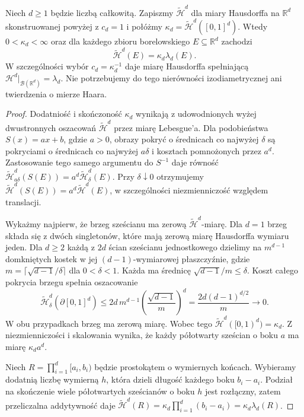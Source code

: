 \begin{twierdzenie}
\label{thm:hausdorff-calibration-26}
Niech $d\ge1$ będzie liczbą całkowitą. Zapiszmy
$\widetilde{\mathcal H}^{d}$ dla miary Hausdorffa
na $\mathbb R^d$ skonstruowanej powyżej z $c_d=1$
i połóżmy $\kappa_d=\widetilde{\mathcal H}^{d}([0,1]^d)$.
Wtedy $0<\kappa_d<\infty$ oraz dla każdego
zbioru borelowskiego $E\subseteq\mathbb R^d$
zachodzi
\[
 \widetilde{\mathcal H}^{d}(E)=\kappa_d\lambda_d(E).
\]
W szczególności wybór $c_d=\kappa_d^{-1}$ daje
miarę Hausdorffa spełniającą
$\mathcal H^d|_{\mathcal B(\mathbb R^d)}=\lambda_d$.
Nie potrzebujemy do tego nierówności izodiametrycznej
ani twierdzenia o mierze Haara.
\end{twierdzenie}
\begin{proof}
Dodatniość i skończoność $\kappa_d$ wynikają z
udowodnionych wyżej dwustronnych oszacowań
$\widetilde{\mathcal H}^{d}$ przez miarę Lebesgue'a.
Dla podobieństwa $S(x)=ax+b$, gdzie $a>0$,
obrazy pokryć o średnicach co najwyżej $\delta$
są pokryciami o średnicach co najwyżej $a\delta$
i kosztach pomnożonych przez $a^d$.
Zastosowanie tego samego argumentu do $S^{-1}$
daje równość
$\widetilde{\mathcal H}^{d}_{a\delta}(S(E))
=a^d\widetilde{\mathcal H}^{d}_\delta(E)$.
Przy $\delta\downarrow0$ otrzymujemy
$\widetilde{\mathcal H}^{d}(S(E))
=a^d\widetilde{\mathcal H}^{d}(E)$,
w szczególności niezmienniczość względem translacji.

Wykażmy najpierw, że brzeg sześcianu ma zerową
$\widetilde{\mathcal H}^{d}$-miarę.
Dla $d=1$ brzeg składa się z dwóch singletonów,
które mają zerową miarę Hausdorffa wymiaru jeden.
Dla $d\ge2$ każdą z $2d$ ścian sześcianu jednostkowego
dzielimy na $m^{d-1}$ domkniętych kostek w jej
$(d-1)$-wymiarowej płaszczyźnie, gdzie
$m=\lceil\sqrt{d-1}/\delta\rceil$ dla $0<\delta<1$.
Każda ma średnicę $\sqrt{d-1}/m\le\delta$.
Koszt całego pokrycia brzegu spełnia oszacowanie
\[
 \widetilde{\mathcal H}^{d}_\delta(\partial[0,1]^d)
 \le 2d\,m^{d-1}
          \left(\frac{\sqrt{d-1}}m\right)^d
 =\frac{2d(d-1)^{d/2}}m\longrightarrow0.
\]
W obu przypadkach brzeg ma zerową miarę. Wobec tego
$\widetilde{\mathcal H}^{d}([0,1)^d)=\kappa_d$.
Z niezmienniczości i skalowania wynika, że każdy
półotwarty sześcian o boku $a$ ma miarę
$\kappa_da^d$.

Niech $R=\prod_{i=1}^d[a_i,b_i)$ będzie
prostokątem o wymiernych końcach.
Wybieramy dodatnią liczbę wymierną $h$, która
dzieli długość każdego boku $b_i-a_i$.
Podział na skończenie wiele półotwartych sześcianów
o boku $h$ jest rozłączny, zatem przeliczalna
addytywność daje
$\widetilde{\mathcal H}^{d}(R)
=\kappa_d\prod_{i=1}^d(b_i-a_i)
=\kappa_d\lambda_d(R)$.


\end{proof}
